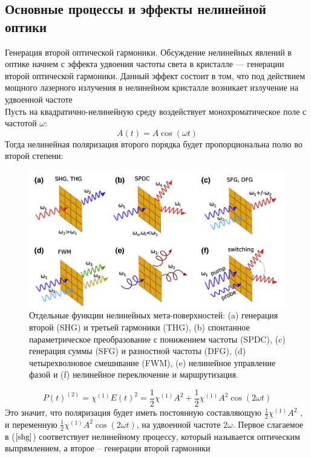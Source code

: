 \subsection{Основные процессы и эффекты нелинейной оптики}
\hspace*{2mm}Генерация второй оптической гармоники. 
Обсуждение нелинейных явлений в оптике начнем с
эффекта удвоения частоты света в кристалле — генерации второй оптической
гармоники. Данный эффект состоит в том, что под действием мощного лазерного излучения в нелинейном кристалле возникает излучение на удвоенной
частоте
\\
\hspace{2mm}
Пусть на квадратично-нелинейную среду воздействует монохроматическое поле с частотой $\omega$:
 \begin{equation}\label{shg:e(t)}
A(t) = A\cos(\omega t)
\end{equation}
Тогда нелинейная поляризация второго порядка будет пропорциональна
полю во второй степени:
 \begin{figure}[h!]
	\centering
	\includegraphics[width=1\linewidth]{images/harmonics.png}
	\caption{Отдельные функции нелинейных мета-поверхностей: (a) генерация второй (SHG) и третьей гармоники (THG), (b) спонтанное параметрическое преобразование с понижением частоты (SPDC), (c) генерация суммы (SFG) и разностной частоты (DFG), (d) четырехволновое смешивание (FWM), (e) нелинейное управление фазой и (f) нелинейное переключение и маршрутизация.}
	\label{harmonics}
\end{figure}
 \begin{equation}\label{shg}
P(t)^{(2)} = \chi^{(1)}E(t)^2 = \frac{1}{2}\chi^{(1)}A^2 + \frac{1}{2}\chi^{(1)}A^2\cos(2\omega t)
\end{equation}
Это значит, что поляризация будет иметь постоянную составляющую $ \frac{1}{2}\chi^{(1)}A^2$ , и
переменную $\frac{1}{2}\chi^{(1)}A^2\cos(2\omega t)$, на удвоенной частоте $2\omega$. Первое слагаемое в ($\ref{shg}$) соответствует нелинейному процессу, который называется оптическим выпрямлением, а второе – генерации второй гармоники

